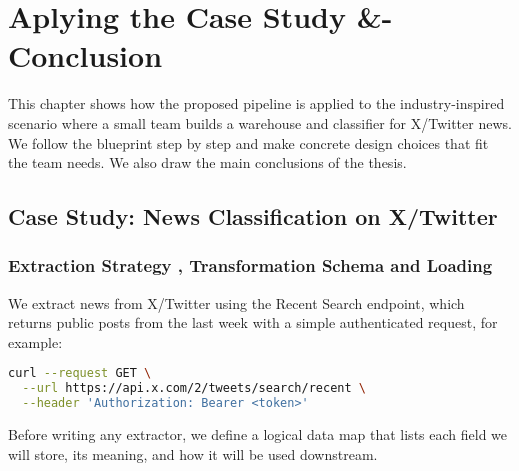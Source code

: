 \chapter{Aplying the Case Study \&- Conclusion}
\label{ch:conclusion}
This chapter shows how the proposed pipeline is applied to the industry-inspired scenario where a small team builds a warehouse and classifier for X/Twitter news. We follow the blueprint step by step and make concrete design choices that fit the team needs.
We also draw the main conclusions of the thesis.


\section{Case Study: News Classification on X/Twitter}

\subsection{Extraction Strategy , Transformation Schema and Loading}

We extract news from X/Twitter using the Recent Search endpoint, which returns public posts from the last week with a simple authenticated request, for example:
\begin{lstlisting}[language=bash,caption={Recent search via X API},label={lst:x-recent-search}]
curl --request GET \
  --url https://api.x.com/2/tweets/search/recent \
  --header 'Authorization: Bearer <token>'
\end{lstlisting}

Before writing any extractor, we define a logical data map that lists each field we will store, its meaning, and how it will be used downstream.


